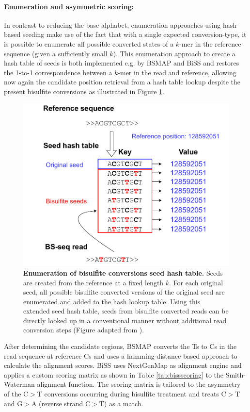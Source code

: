 \paragraph{Enumeration and asymmetric scoring:} In contrast to reducing the base alphabet, enumeration approaches using hash-based seeding make use of the fact that with a single expected conversion-type, it is possible to enumerate all possible converted states of a $k$-mer in the reference sequence (given a sufficiently small $k$). This enumeration approach to create a hash table of seeds is both implemented e.g. by BSMAP \citep{Xi2009} and BiSS \citep{Dinh2012AdvancedArabidopsis} and restores the 1-to-1 correspondence between a $k$-mer in the read and reference, allowing now again the candidate position retrieval from a hash table lookup despite the present bisulfite conversions as illustrated in Figure \ref{fig:bisulfitehash}.

\begin{figure}[h]
	 \centering
	 \includegraphics[width=0.7\linewidth]{img/chapter1/bisulfite_enumeration}
	  \caption[Enumeration of bisulfite conversions seed hash table]{\textbf{Enumeration of bisulfite conversions seed hash table.} Seeds are created from the reference at a fixed length $k$. For each original seed, all possible bisulfite converted versions of the original seed are enumerated and added to the hash lookup table. Using this extended seed hash table, seeds from bisulfite converted reads can be directly looked up in a conventional manner without additional read conversion steps (Figure adapted from \citeauthor{Xi2009} \citep{Xi2009}).}
	 \label{fig:bisulfitehash}
\end{figure}

After determining the candidate regions, BSMAP converts the Ts to Cs in the read sequence at reference Cs and uses a hamming-distance based approach to calculate the alignment scores. BiSS uses NextGenMap \citep{Sedlazeck2013} as alignment engine and applies a custom scoring matrix as shown in Table \ref{tab:bissscoring} to the Smith-Waterman alignment function. The scoring matrix is tailored to the asymmetry of the C$>$T conversions occurring during bisulfite treatment and treats C$>$T and G$>$A (reverse strand C$>$T) as a match.

